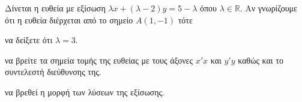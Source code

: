 Δίνεται η ευθεία με εξίσωση $ \lambda x+(\lambda-2)y=5-\lambda $ όπου $ \lambda\in\mathbb{R} $. Αν γνωρίζουμε ότι η ευθεία διέρχεται από το σημείο $ A(1,-1) $ τότε
\begin{alist}
\item να δείξετε ότι $ \lambda=3 $.
\item να βρείτε τα σημεία τομής της ευθείας με τους άξονες $ x'x $ και $ y'y $ καθώς και το συντελεστή διεύθυνσης της.
\item να βρεθεί η μορφή των λύσεων της εξίσωσης.
\end{alist}

